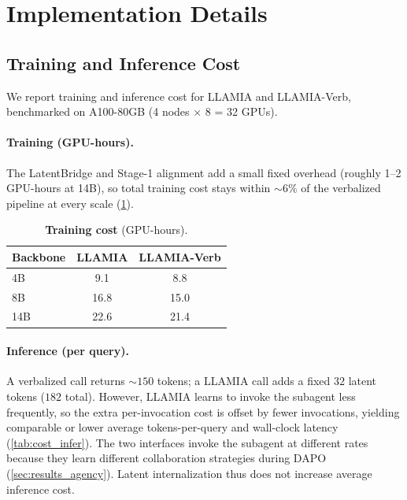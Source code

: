 \section{Implementation Details}
\label{sec:app_implementation}

\subsection{Training and Inference Cost}
\label{sec:app_cost}

We report training and inference cost for LLAMIA and LLAMIA-Verb, benchmarked on A100-80GB (4 nodes $\times$ 8 = 32 GPUs).

\paragraph{Training (GPU-hours).} The LatentBridge and Stage-1 alignment add a small fixed overhead (roughly 1--2 GPU-hours at 14B), so total training cost stays within ${\sim}6\%$ of the verbalized pipeline at every scale (\cref{tab:cost_train}).

\begin{table}[h]
\centering
\caption{\textbf{Training cost} (GPU-hours).}
\label{tab:cost_train}
\small
\begin{tabular}{lcc}
\toprule[1.2pt]
\textbf{Backbone} & \textbf{LLAMIA} & \textbf{LLAMIA-Verb} \\
\midrule
4B  & 9.1  & 8.8  \\
8B  & 16.8 & 15.0 \\
14B & 22.6 & 21.4 \\
\bottomrule[1.2pt]
\end{tabular}
\end{table}

\paragraph{Inference (per query).} A verbalized call returns ${\sim}150$ tokens; a LLAMIA call adds a fixed $32$ latent tokens ($182$ total). However, LLAMIA learns to invoke the subagent less frequently, so the extra per-invocation cost is offset by fewer invocations, yielding comparable or lower average tokens-per-query and wall-clock latency (\cref{tab:cost_infer}). The two interfaces invoke the subagent at different rates because they learn different collaboration strategies during DAPO (\cref{sec:results_agency}). Latent internalization thus does not increase average inference cost.

